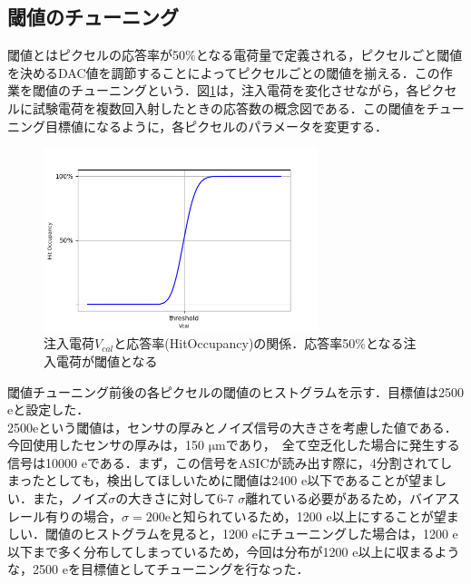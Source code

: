 \subsection{閾値のチューニング}
閾値とはピクセルの応答率が50$\mathrm{\%}$となる電荷量で定義される，ピクセルごと閾値を決めるDAC値を調節することによってピクセルごとの閾値を揃える．この作業を閾値のチューニングという．図\ref{fig:scurve}は，注入電荷を変化させながら，各ピクセルに試験電荷を複数回入射したときの応答数の概念図である．この閾値をチューニング目標値になるように，各ピクセルのパラメータを変更する．
\begin{figure}[h]
\centering
\includegraphics[width=8cm]{./figure/scurve.png}
\caption{注入電荷$V_{cal}$と応答率(HitOccupancy)の関係．応答率50$\mathrm{\%}$となる注入電荷が閾値となる}
\label{fig:scurve}
\end{figure}

閾値チューニング前後の各ピクセルの閾値のヒストグラムを示す．目標値は2500$\mathrm{e}$と設定した．\\
2500$\mathrm{e}$という閾値は，センサの厚みとノイズ信号の大きさを考慮した値である．今回使用したセンサの厚みは，150 $\mathrm{\mu m}$であり，　全て空乏化した場合に発生する信号は10000 $\mathrm{e}$である．まず，この信号をASICが読み出す際に，4分割されてしまったとしても，検出してほしいために閾値は2400 $\mathrm{e}$以下であることが望ましい．また，ノイズ$\sigma$の大きさに対して6-7 $\sigma$離れている必要があるため，バイアスレール有りの場合，$\sigma = 200 \mathrm{e}$と知られているため，1200 $\mathrm{e}$以上にすることが望ましい．閾値のヒストグラムを見ると，1200 $\mathrm{e}$にチューニングした場合は，1200 $\mathrm{e}$以下まで多く分布してしまっているため，今回は分布が1200 $\mathrm{e}$以上に収まるような，2500 $\mathrm{e}$を目標値としてチューニングを行なった．

